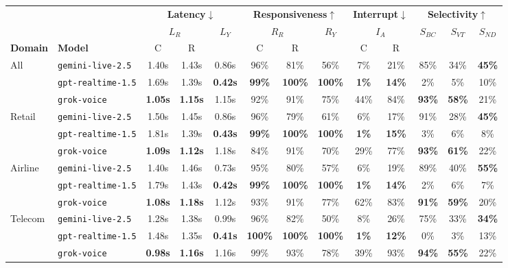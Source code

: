 \begin{tabular}{@{}ll|cc|c|cc|c|cc|ccc@{}}
\toprule
 & & \multicolumn{3}{c|}{\textbf{Latency}$\downarrow$} & \multicolumn{3}{c|}{\textbf{Responsiveness}$\uparrow$} & \multicolumn{2}{c|}{\textbf{Interrupt}$\downarrow$} & \multicolumn{3}{c}{\textbf{Selectivity}$\uparrow$} \\
 & & \multicolumn{2}{c|}{$L_R$} & \multirow{2}{*}{$L_Y$} & \multicolumn{2}{c|}{$R_R$} & \multirow{2}{*}{$R_Y$} & \multicolumn{2}{c|}{$I_A$} & \multirow{2}{*}{$S_{BC}$} & \multirow{2}{*}{$S_{VT}$} & \multirow{2}{*}{$S_{ND}$} \\
\textbf{Domain} & {\textbf{Model}} & C & R & & C & R & & C & R & & & \\
\midrule
\multirow{3}{*}{All} & {\texttt{gemini-live-2.5}} & 1.40s & 1.43s & 0.86s & 96\% & 81\% & 56\% & 7\% & 21\% & 85\% & 34\% & \textbf{45\%} \\
 & {\texttt{gpt-realtime-1.5}} & 1.69s & 1.39s & \textbf{0.42s} & \textbf{99\%} & \textbf{100\%} & \textbf{100\%} & \textbf{1\%} & \textbf{14\%} & 2\% & 5\% & 10\% \\
 & {\texttt{grok-voice}} & \textbf{1.05s} & \textbf{1.15s} & 1.15s & 92\% & 91\% & 75\% & 44\% & 84\% & \textbf{93\%} & \textbf{58\%} & 21\% \\
\midrule
\multirow{3}{*}{Retail} & {\texttt{gemini-live-2.5}} & 1.50s & 1.45s & 0.86s & 96\% & 79\% & 61\% & 6\% & 17\% & 91\% & 28\% & \textbf{45\%} \\
 & {\texttt{gpt-realtime-1.5}} & 1.81s & 1.39s & \textbf{0.43s} & \textbf{99\%} & \textbf{100\%} & \textbf{100\%} & \textbf{1\%} & \textbf{15\%} & 3\% & 6\% & 8\% \\
 & {\texttt{grok-voice}} & \textbf{1.09s} & \textbf{1.12s} & 1.18s & 84\% & 91\% & 70\% & 29\% & 77\% & \textbf{93\%} & \textbf{61\%} & 22\% \\
\midrule
\multirow{3}{*}{Airline} & {\texttt{gemini-live-2.5}} & 1.40s & 1.46s & 0.73s & 95\% & 80\% & 57\% & 6\% & 19\% & 89\% & 40\% & \textbf{55\%} \\
 & {\texttt{gpt-realtime-1.5}} & 1.79s & 1.43s & \textbf{0.42s} & \textbf{99\%} & \textbf{100\%} & \textbf{100\%} & \textbf{1\%} & \textbf{14\%} & 2\% & 6\% & 7\% \\
 & {\texttt{grok-voice}} & \textbf{1.08s} & \textbf{1.18s} & 1.12s & 93\% & 91\% & 77\% & 62\% & 83\% & \textbf{91\%} & \textbf{59\%} & 20\% \\
\midrule
\multirow{3}{*}{Telecom} & {\texttt{gemini-live-2.5}} & 1.28s & 1.38s & 0.99s & 96\% & 82\% & 50\% & 8\% & 26\% & 75\% & 33\% & \textbf{34\%} \\
 & {\texttt{gpt-realtime-1.5}} & 1.48s & 1.35s & \textbf{0.41s} & \textbf{100\%} & \textbf{100\%} & \textbf{100\%} & \textbf{1\%} & \textbf{12\%} & 0\% & 3\% & 13\% \\
 & {\texttt{grok-voice}} & \textbf{0.98s} & \textbf{1.16s} & 1.16s & 99\% & 93\% & 78\% & 39\% & 93\% & \textbf{94\%} & \textbf{55\%} & 22\% \\
\bottomrule
\end{tabular}